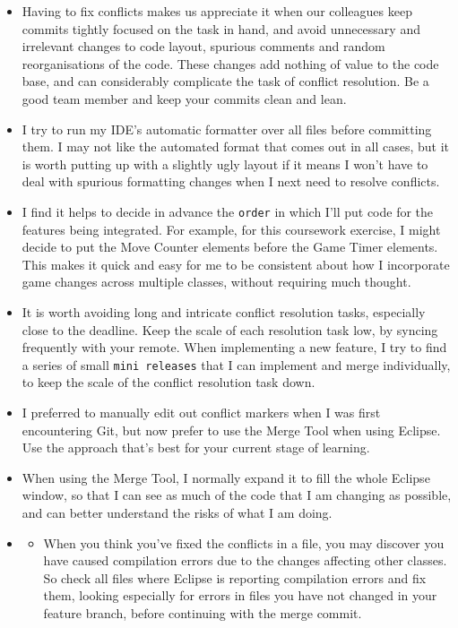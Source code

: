 \documentclass[
]{book}
\providecommand{\tightlist}{%
  \setlength{\itemsep}{0pt}\setlength{\parskip}{0pt}}
\begin{document}
\begin{itemize}
\item
  Having to fix conflicts makes us appreciate it when our colleagues keep commits tightly focused on the task in hand, and avoid unnecessary and irrelevant changes to code layout, spurious comments and random reorganisations of the code. These changes add nothing of value to the code base, and can considerably complicate the task of conflict resolution. Be a good team member and keep your commits clean and lean.
\item
  I try to run my IDE's automatic formatter over all files before committing them. I may not like the automated format that comes out in all cases, but it is worth putting up with a slightly ugly layout if it means I won't have to deal with spurious formatting changes when I next need to resolve conflicts.
\item
  I find it helps to decide in advance the \texttt{order} in which I'll put code for the features being integrated. For example, for this coursework exercise, I might decide to put the Move Counter elements before the Game Timer elements. This makes it quick and easy for me to be consistent about how I incorporate game changes across multiple classes, without requiring much thought.
\item
  It is worth avoiding long and intricate conflict resolution tasks, especially close to the deadline. Keep the scale of each resolution task low, by syncing frequently with your remote. When implementing a new feature, I try to find a series of small \texttt{mini\ releases} that I can implement and merge individually, to keep the scale of the conflict resolution task down.
\item
  I preferred to manually edit out conflict markers when I was first encountering Git, but now prefer to use the Merge Tool when using Eclipse. Use the approach that's best for your current stage of learning.
\item
  When using the Merge Tool, I normally expand it to fill the whole Eclipse window, so that I can see as much of the code that I am changing as possible, and can better understand the risks of what I am doing.
\item
  \begin{itemize}
  \tightlist
  \item
    When you think you've fixed the conflicts in a file, you may discover you have caused compilation errors due to the changes affecting other classes. So check all files where Eclipse is reporting compilation errors and fix them, looking especially for errors in files you have not changed in your feature branch, before continuing with the merge commit.

\end{itemize}
\end{itemize}
\end{document}
